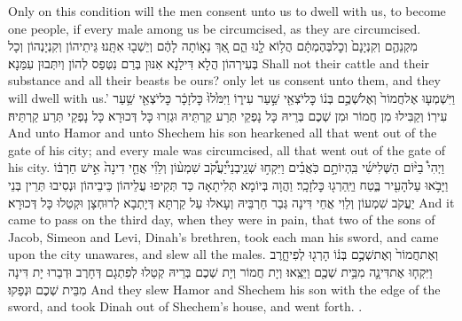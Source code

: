 {Only on this condition will the men consent unto us to dwell with us, to become one people, if every male among us be circumcised, as they are circumcised.}{}
{מִקְנֵהֶ֤ם וְקִנְיָנָם֙ וְכׇל\maqqaf בְּהֶמְתָּ֔ם הֲל֥וֹא לָ֖נוּ הֵ֑ם אַ֚ךְ נֵא֣וֹתָה לָהֶ֔ם וְיֵשְׁב֖וּ אִתָּֽנוּ׃}
{גֵּיתֵיהוֹן וְקִנְיָנְהוֹן וְכָל בְּעִירְהוֹן הֲלָא דִּילַנָא אִנּוּן בְּרַם נִטְּפַס לְהוֹן וְיִתְּבוּן עִמַּנָא׃}
{Shall not their cattle and their substance and all their beasts be ours? only let us consent unto them, and they will dwell with us.’}{}
{וַיִּשְׁמְע֤וּ אֶל\maqqaf חֲמוֹר֙ וְאֶל\maqqaf שְׁכֶ֣ם בְּנ֔וֹ כׇּל\maqqaf יֹצְאֵ֖י שַׁ֣עַר עִיר֑וֹ וַיִּמֹּ֙לוּ֙ כׇּל\maqqaf זָכָ֔ר כׇּל\maqqaf יֹצְאֵ֖י שַׁ֥עַר עִירֽוֹ׃}
{וְקַבִּילוּ מִן חֲמוֹר וּמִן שְׁכֶם בְּרֵיהּ כָּל נָפְקֵי תְּרַע קַרְתֵּיהּ וּגְזַרוּ כָּל דְּכוּרָא כָּל נָפְקֵי תְּרַע קַרְתֵּיהּ׃}
{And unto Hamor and unto Shechem his son hearkened all that went out of the gate of his city; and every male was circumcised, all that went out of the gate of his city.}{}
{וַיְהִי֩ בַיּ֨וֹם הַשְּׁלִישִׁ֜י בִּֽהְיוֹתָ֣ם כֹּֽאֲבִ֗ים וַיִּקְח֣וּ שְׁנֵֽי\maqqaf בְנֵי\maqqaf יַ֠עֲקֹ֠ב שִׁמְע֨וֹן וְלֵוִ֜י אֲחֵ֤י דִינָה֙ אִ֣ישׁ חַרְבּ֔וֹ וַיָּבֹ֥אוּ עַל\maqqaf הָעִ֖יר בֶּ֑טַח וַיַּֽהַרְג֖וּ כׇּל\maqqaf זָכָֽר׃}
{וַהֲוָה בְּיוֹמָא תְּלִיתָאָה כַּד תְּקִיפוּ עֲלֵיהוֹן כֵּיבֵיהוֹן וּנְסִיבוּ תְּרֵין בְּנֵי יַעֲקֹב שִׁמְעוֹן וְלֵוִי אֲחֵי דִּינָה גְּבַר חַרְבֵּיהּ וְעָאלוּ עַל קַרְתָּא דְּיָתְבָא לְרוּחְצָן וּקְטַלוּ כָּל דְּכוּרָא׃}
{And it came to pass on the third day, when they were in pain, that two of the sons of Jacob, Simeon and Levi, Dinah’s brethren, took each man his sword, and came upon the city unawares, and slew all the males.}{}
{וְאֶת\maqqaf חֲמוֹר֙ וְאֶת\maqqaf שְׁכֶ֣ם בְּנ֔וֹ הָרְג֖וּ לְפִי\maqqaf חָ֑רֶב וַיִּקְח֧וּ אֶת\maqqaf דִּינָ֛ה מִבֵּ֥ית שְׁכֶ֖ם וַיֵּצֵֽאוּ׃}
{וְיָת חֲמוֹר וְיָת שְׁכֶם בְּרֵיהּ קְטַלוּ לְפִתְגָם דְּחָרֶב וּדְבַרוּ יָת דִּינָה מִבֵּית שְׁכֶם וּנְפַקוּ׃}
{And they slew Hamor and Shechem his son with the edge of the sword, and took Dinah out of Shechem’s house, and went forth. .}{}

